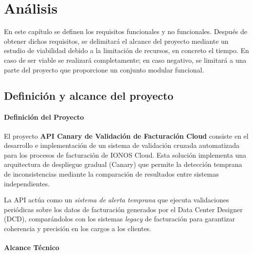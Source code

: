 \chapter{Análisis}\label{chap:analisis}
En este capítulo se definen los requisitos funcionales y no funcionales. Después de obtener dichos requisitos, se delimitará el alcance del proyecto mediante un estudio de viabilidad debido a la limitación de recursos, en concreto el tiempo. En caso de ser viable se realizará completamente; en caso negativo, se limitará a una parte del proyecto que proporcione un conjunto modular funcional.

\section{Definición y alcance del proyecto}
\subsubsection{Definición del Proyecto}

El proyecto \textbf{API Canary de Validación de Facturación Cloud} consiste en el desarrollo e implementación de un sistema de validación cruzada automatizada para los procesos de facturación de IONOS Cloud. Esta solución implementa una arquitectura de despliegue gradual (Canary) que permite la detección temprana de inconsistencias mediante la comparación de resultados entre sistemas independientes.

La API actúa como un \textit{sistema de alerta temprana} que ejecuta validaciones periódicas sobre los datos de facturación generados por el Data Center Designer (DCD), comparándolos con los sistemas \textit{legacy} de facturación para garantizar coherencia y precisión en los cargos a los clientes.

\subsubsection{Alcance Técnico}


